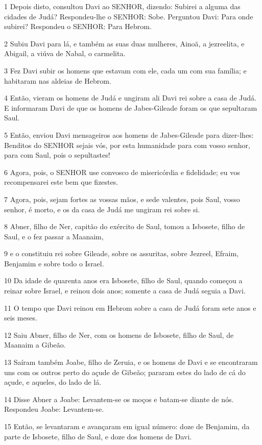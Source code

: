 \par 1 Depois disto, consultou Davi ao SENHOR, dizendo: Subirei a alguma das cidades de Judá? Respondeu-lhe o SENHOR: Sobe. Perguntou Davi: Para onde subirei? Respondeu o SENHOR: Para Hebrom.
\par 2 Subiu Davi para lá, e também as suas duas mulheres, Ainoã, a jezreelita, e Abigail, a viúva de Nabal, o carmelita.
\par 3 Fez Davi subir os homens que estavam com ele, cada um com sua família; e habitaram nas aldeias de Hebrom.
\par 4 Então, vieram os homens de Judá e ungiram ali Davi rei sobre a casa de Judá. E informaram Davi de que os homens de Jabes-Gileade foram os que sepultaram Saul.
\par 5 Então, enviou Davi mensageiros aos homens de Jabes-Gileade para dizer-lhes: Benditos do SENHOR sejais vós, por esta humanidade para com vosso senhor, para com Saul, pois o sepultastes!
\par 6 Agora, pois, o SENHOR use convosco de misericórdia e fidelidade; eu vos recompensarei este bem que fizestes.
\par 7 Agora, pois, sejam fortes as vossas mãos, e sede valentes, pois Saul, vosso senhor, é morto, e os da casa de Judá me ungiram rei sobre si.
\par 8 Abner, filho de Ner, capitão do exército de Saul, tomou a Isbosete, filho de Saul, e o fez passar a Maanaim,
\par 9 e o constituiu rei sobre Gileade, sobre os assuritas, sobre Jezreel, Efraim, Benjamim e sobre todo o Israel.
\par 10 Da idade de quarenta anos era Isbosete, filho de Saul, quando começou a reinar sobre Israel, e reinou dois anos; somente a casa de Judá seguia a Davi.
\par 11 O tempo que Davi reinou em Hebrom sobre a casa de Judá foram sete anos e seis meses.
\par 12 Saiu Abner, filho de Ner, com os homens de Isbosete, filho de Saul, de Maanaim a Gibeão.
\par 13 Saíram também Joabe, filho de Zeruia, e os homens de Davi e se encontraram uns com os outros perto do açude de Gibeão; pararam estes do lado de cá do açude, e aqueles, do lado de lá.
\par 14 Disse Abner a Joabe: Levantem-se os moços e batam-se diante de nós. Respondeu Joabe: Levantem-se.
\par 15 Então, se levantaram e avançaram em igual número: doze de Benjamim, da parte de Isbosete, filho de Saul, e doze dos homens de Davi.
